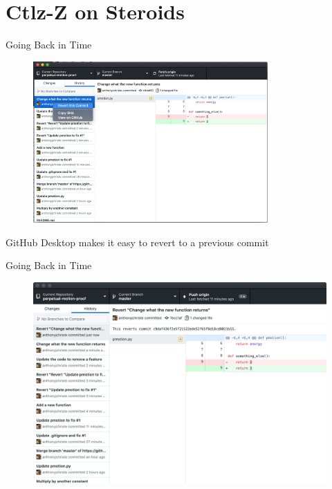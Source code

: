 \documentclass{beamer}
\begin{document}
    \section{Ctlz-Z on Steroids}
    \begin{frame}{Going Back in Time}
        \begin{figure}
            \centering
            \includegraphics[width=0.8\textwidth]{figures/revert_1.png}
        \end{figure}
        \centering
        GitHub Desktop makes it easy to revert to a previous commit
    \end{frame}

    \begin{frame}{Going Back in Time}
        \begin{figure}
            \centering
            \includegraphics[width=\textwidth]{figures/revert_2.png}
        \end{figure}
        \centering
    \end{frame}
\end{document}
